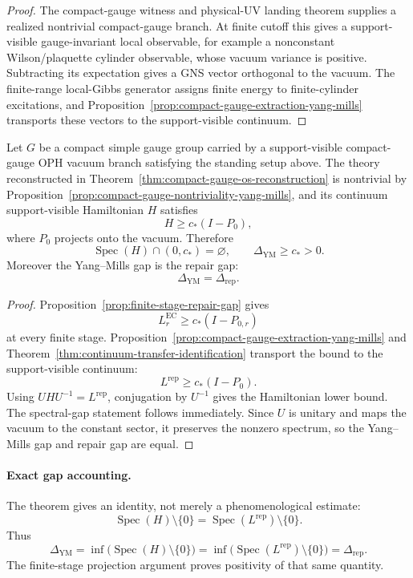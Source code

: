 \begin{proof}
The compact-gauge witness and physical-UV landing theorem supplies a realized nontrivial
compact-gauge branch. At finite cutoff this gives a support-visible gauge-invariant local
observable, for example a nonconstant Wilson/plaquette cylinder observable, whose vacuum variance
is positive. Subtracting its expectation gives a GNS vector orthogonal to the vacuum. The
finite-range local-Gibbs generator assigns finite energy to finite-cylinder excitations, and
Proposition~\ref{prop:compact-gauge-extraction-yang-mills} transports these vectors to the
support-visible continuum.
\end{proof}

\begin{theorem}
\label{thm:oph-yang-mills-gap}
Let \(G\) be a compact simple gauge group carried by a support-visible compact-gauge OPH vacuum
branch satisfying the standing setup above. The theory reconstructed in
Theorem~\ref{thm:compact-gauge-os-reconstruction} is nontrivial by
Proposition~\ref{prop:compact-gauge-nontriviality-yang-mills}, and its continuum support-visible
Hamiltonian \(H\)
satisfies
\[
H\ge c_*(I-P_0),
\]
where \(P_0\) projects onto the vacuum. Therefore
\[
\operatorname{Spec}(H)\cap(0,c_*)=\varnothing,
\qquad
\Delta_{\mathrm{YM}}\ge c_*>0.
\]
Moreover the Yang--Mills gap is the repair gap:
\[
\Delta_{\mathrm{YM}}=\Delta_{\mathrm{rep}}.
\]
\end{theorem}

\begin{proof}
Proposition~\ref{prop:finite-stage-repair-gap} gives
\[
L_r^{\mathrm{EC}}\ge c_*(I-P_{0,r})
\]
at every finite stage. Proposition~\ref{prop:compact-gauge-extraction-yang-mills} and
Theorem~\ref{thm:continuum-transfer-identification} transport the bound to the support-visible
continuum:
\[
L^{\mathrm{rep}}\ge c_*(I-P_0).
\]
Using \(UHU^{-1}=L^{\mathrm{rep}}\), conjugation by \(U^{-1}\) gives the Hamiltonian lower bound.
The spectral-gap statement follows immediately. Since \(U\) is unitary and maps the vacuum to the
constant sector, it preserves the nonzero spectrum, so the Yang--Mills gap and repair gap are
equal.
\end{proof}

\paragraph{Exact gap accounting.}
The theorem gives an identity, not merely a phenomenological estimate:
\[
\operatorname{Spec}(H)\setminus\{0\}
=
\operatorname{Spec}(L^{\mathrm{rep}})\setminus\{0\}.
\]
Thus
\[
\Delta_{\mathrm{YM}}
=
\inf\bigl(\operatorname{Spec}(H)\setminus\{0\}\bigr)
=
\inf\bigl(\operatorname{Spec}(L^{\mathrm{rep}})\setminus\{0\}\bigr)
=
\Delta_{\mathrm{rep}}.
\]
The finite-stage projection argument proves positivity of that same quantity.


